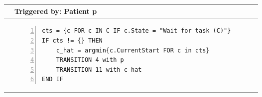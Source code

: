 \begin{tabular}{@{}>{\raggedright\arraybackslash}p{0.25cm}>{\raggedright\arraybackslash}p{13cm}@{}}
  \toprule
   & Triggered by: Patient p\\ \midrule 
  &
\vspace{-12pt}
\begin{Verbatim}[numbers=left]
cts = {c FOR c IN C IF c.State = "Wait for task (C)"}
IF cts != {} THEN 
    c_hat = argmin{c.CurrentStart FOR c in cts}
    TRANSITION 4 with p
    TRANSITION 11 with c_hat
END IF
  \end{Verbatim}
  \\ \bottomrule
  \end{tabular}